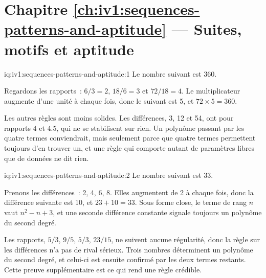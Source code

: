 \section*{Chapitre \ref{ch:iv1:sequences-patterns-and-aptitude} --- Suites, motifs et aptitude}

\begin{solution}{iq:iv1:sequences-patterns-and-aptitude:1}
Le nombre suivant est 360.

Regardons les rapports~: $6/3 = 2$, $18/6 = 3$ et $72/18 = 4$. Le multiplicateur augmente d'une unité à chaque fois, donc le suivant est 5, et $72 \times 5 = 360$.

Les autres règles sont moins solides. Les différences, 3, 12 et 54, ont pour rapports 4 et $4.5$, qui ne se stabilisent sur rien. Un polynôme passant par les quatre termes conviendrait, mais seulement parce que quatre termes permettent toujours d'en trouver un, et une règle qui comporte autant de paramètres libres que de données ne dit rien.

\end{solution}

\begin{solution}{iq:iv1:sequences-patterns-and-aptitude:2}
Le nombre suivant est 33.

Prenons les différences~: 2, 4, 6, 8. Elles augmentent de 2 à chaque fois, donc la différence suivante est 10, et $23 + 10 = 33$. Sous forme close, le terme de rang $n$ vaut $n^2 - n + 3$, et une seconde différence constante signale toujours un polynôme du second degré.

Les rapports, $5/3$, $9/5$, $5/3$, $23/15$, ne suivent aucune régularité, donc la règle sur les différences n'a pas de rival sérieux. Trois nombres déterminent un polynôme du second degré, et celui-ci est ensuite confirmé par les deux termes restants. Cette preuve supplémentaire est ce qui rend une règle crédible.

\end{solution}

